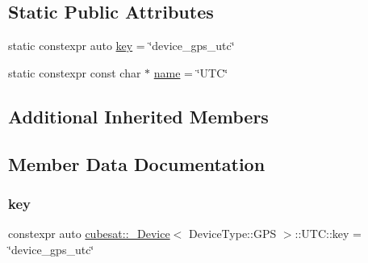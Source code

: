 \subsection*{Static Public Attributes}
\begin{DoxyCompactItemize}
\item 
static constexpr auto \hyperlink{structcubesat_1_1__Device_3_01DeviceType_1_1GPS_01_4_1_1UTC_a1dbe9f4c5ccd15ea1a6781b868c2985f}{key} = \char`\"{}device\+\_\+gps\+\_\+utc\char`\"{}
\item 
static constexpr const char $\ast$ \hyperlink{structcubesat_1_1__Device_3_01DeviceType_1_1GPS_01_4_1_1UTC_aaf27345da5794817b9d3dd32858b7838}{name} = \char`\"{}U\+TC\char`\"{}
\end{DoxyCompactItemize}
\subsection*{Additional Inherited Members}


\subsection{Member Data Documentation}
\mbox{\label{structcubesat_1_1__Device_3_01DeviceType_1_1GPS_01_4_1_1UTC_a1dbe9f4c5ccd15ea1a6781b868c2985f}} 
\subsubsection{\texorpdfstring{key}{key}}
{\footnotesize\ttfamily constexpr auto \hyperlink{structcubesat_1_1__Device}{cubesat\+::\+\_\+\+Device}$<$ Device\+Type\+::\+G\+PS $>$\+::U\+T\+C\+::key = \char`\"{}device\+\_\+gps\+\_\+utc\char`\"{}\hspace{0.3cm}{\ttfamily [static]}}

\mbox{\label{structcubesat_1_1__Device_3_01DeviceType_1_1GPS_01_4_1_1UTC_aaf27345da5794817b9d3dd32858b7838}} 

